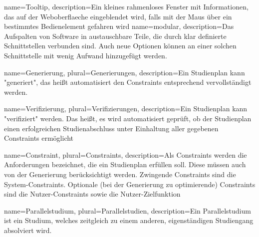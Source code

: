 {
	name=Tooltip,
	description={Ein kleines rahmenloses Fenster mit Informationen, das auf der \gls{Weboberflaeche} eingeblendet wird, falls mit der Maus über ein bestimmtes Bedienelement gefahren wird}
}
{
	name=modular,
	description={Das Aufspalten von Software in austauschbare Teile, die durch klar definierte Schnittstellen verbunden sind. Auch neue Optionen können an einer solchen Schnittstelle mit wenig Aufwand hinzugefügt werden.}
}
	
{
	name=Generierung,
	plural=Generierungen,
	description={Ein \gls{Studienplan} kann "generiert", das heißt automatisiert den \glspl{Constraint} entsprechend vervollständigt werden.}
}

{
name=Verifizierung,
plural=Verifizierungen,
description={Ein \gls{Studienplan} kann "verifiziert" werden. Das heißt, es wird automatisiert geprüft, ob der Studienplan einen erfolgreichen Studienabschluss unter Einhaltung aller gegebenen \glspl{Constraint} ermöglicht}
}

{
name=Constraint,
plural=Constraints,
description={Als Constraints werden die Anforderungen bezeichnet, die ein \gls{Studienplan} erfüllen soll. Diese müssen auch von der \gls{Generierung} berücksichtigt werden. Zwingende Constraints sind die \glspl{System-Constraint}. Optionale (bei der \gls{Generierung} zu optimierende) Constraints sind die \glspl{Nutzer-Constraint} sowie die \gls{Nutzer-Zielfunktion}}
}



{
name=Parallelstudium,
plural=Parallelstudien,
description={Ein Parallelstudium ist ein Studium, welches zeitgleich zu einem anderen, eigenständigen Studiengang absolviert wird.}
}